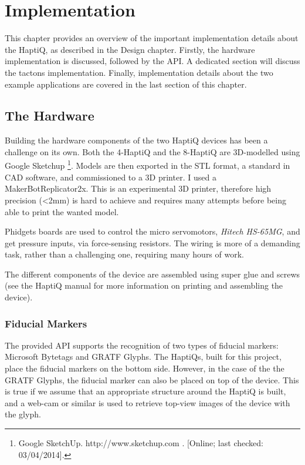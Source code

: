 \chapter{Implementation}

This chapter provides an overview of the important implementation details about the HaptiQ, as described in the Design chapter. 
Firstly, the hardware implementation is discussed, followed by the API. A dedicated section will discuss the tactons implementation. Finally, implementation details about the two example applications are covered in the last section of this chapter.

\section{The Hardware}

Building the hardware components of the two HaptiQ devices has been a challenge on its own. Both the 4-HaptiQ and the 8-HaptiQ are 3D-modelled using Google Sketchup \footnote{Google SketchUp. http://www.sketchup.com . [Online; last checked: 03/04/2014].}. Models are then exported in the STL format, a standard in CAD software, and commissioned to a 3D printer. I used a MakerBot\textregistered   Replicator\texttrademark 2x. This is an experimental 3D printer, therefore high precision (\textless 2mm) is hard to achieve and requires many attempts before being able to print the wanted model. 

Phidgets boards are used to control the micro servomotors, \textit{Hitech HS-65MG}, and get pressure inputs, via force-sensing resistors. The wiring is more of a demanding task, rather than a challenging one, requiring many hours of work.

The different components of the device are assembled using super glue and screws (see the HaptiQ manual for more information on printing and assembling the device). 

\subsection{Fiducial Markers}

The provided API supports the recognition of two types of fiducial markers: Microsoft Bytetags and GRATF Glyphs. The HaptiQs, built for this project, place the fiducial markers on the bottom side. However, in the case of the the GRATF Glyphs, the fiducial marker can also be placed on top of the device. This is true if we assume that an appropriate structure around the HaptiQ is built, and a web-cam or similar is used to retrieve top-view images of the device with the glyph.

